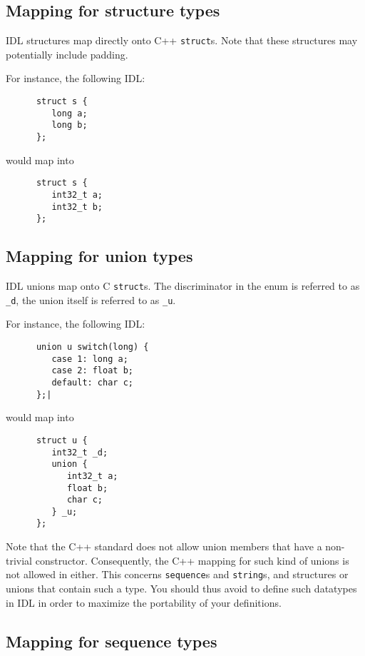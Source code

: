 \subsection{Mapping for structure types}

\GenoM{} IDL  structures map directly onto  C++ {\tt struct}s.  Note that these
structures may potentially include padding.

For instance, the following IDL:
\begin{verbatim}
      struct s {
         long a;
         long b;
      };
\end{verbatim}

would map into
\begin{verbatim}
      struct s {
         int32_t a;
         int32_t b;
      };
\end{verbatim}


\subsection{Mapping for union types}

\GenoM{} IDL unions map onto C  {\tt struct}s. The discriminator in the enum is
referred to as  {\tt \_d}, the union  itself is referred to as  {\tt \_u}.

For instance, the following IDL:
\begin{verbatim}
      union u switch(long) {
         case 1: long a;
         case 2: float b;
         default: char c;
      };|
\end{verbatim}

would map into
\begin{verbatim}
      struct u {
         int32_t _d;
         union {
            int32_t a;
            float b;
            char c;
         } _u;
      };
\end{verbatim}

Note that the C++ standard does  not allow union members that have a non-trivial
constructor.   Consequently, the C++  mapping for  such kind  of unions  is not
allowed in  \GenoM{} either. This  concerns {\tt sequence}s and  {\tt string}s,
and structures  or unions that  contain such a  type. You should thus  avoid to
define such datatypes  in \GenoM{} IDL in order to  maximize the portability of
your definitions.

\subsection{Mapping for sequence types}

